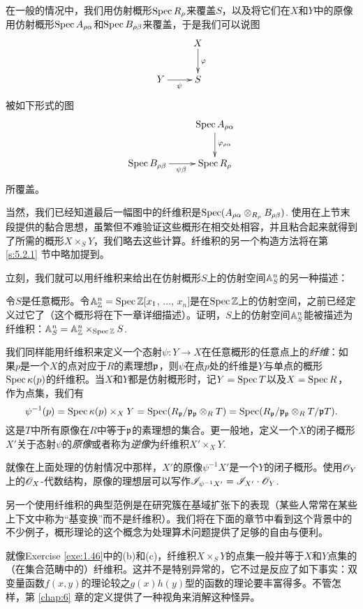 在一般的情况中，我们用仿射概形$\operatorname{Spec} R_\rho$来覆盖$S$，以及将它们在$X$和$Y$中的原像用仿射概形$\operatorname{Spec} A_{\rho\alpha}$和$\operatorname{Spec} B_{\rho\beta}$来覆盖，于是我们可以说图
\[
	\xymatrix{
	&X\ar[d]^\varphi\\
	Y\ar[r]_\psi &S
	}
\]
被如下形式的图
\[
	\xymatrix{
	&\spec A_{\rho\alpha}\ar[d]^{\varphi_{\rho\alpha}}\\
	\spec B_{\rho\beta}\ar[r]_{\psi\beta} &\spec R_{\rho}
	}
\]
所覆盖。

当然，我们已经知道最后一幅图中的纤维积是$\operatorname{Spec}(A_{\rho\alpha}\otimes_{R_\rho}B_{\rho\beta})$. 使用在上节末段提供的黏合思想，虽繁但不难验证这些概形在相交处相容，并且粘合起来就得到了所需的概形$X\times_S Y$，我们略去这些计算。纤维积的另一个构造方法将在第 \ref{s:5.2.1} 节中略加提到。

立刻，我们就可以用纤维积来给出在仿射概形$S$上的仿射空间$\mathbb{A}_S^n$的另一种描述：

\begin{exe}\label{exe:1.47}
令$S$是任意概形。令$\mathbb{A}_{\mathbb{Z}}^n=\operatorname{Spec} \mathbb{Z}[x_1$, $\dots$, $x_n]$是在$\operatorname{Spec} \mathbb{Z}$上的仿射空间，之前已经定义过它了（这个概形将在下一章详细描述）。证明，$S$上的仿射空间$\mathbb{A}_S^n$能被描述为纤维积：$\mathbb{A}_S^n=\mathbb{A}_{\mathbb{Z}}^n\times_{\operatorname{Spec} \mathbb{Z}} S$.
\end{exe}

我们同样能用纤维积来定义一个态射$\psi:Y\to X$在任意概形的任意点上的\textit{纤维}：如果$p$是一个$X$的点对应于$R$的素理想$\mathfrak{p}$，则$\psi$在点$p$处的纤维是$Y$与单点的概形$\operatorname{Spec} \kappa(p)$的纤维积。当$X$和$Y$都是仿射概形时，记$Y=\operatorname{Spec} T$以及$X=\operatorname{Spec} R$，作为点集，我们有
\[
	\psi^{-1}(p)=\operatorname{Spec} \kappa(p)\times_X Y=\operatorname{Spec} (R_{\mathfrak{p}} /\mathfrak{p}_{\mathfrak{p}} \otimes_R T)=\operatorname{Spec} (R_{\mathfrak{p}}/\mathfrak{p}_{\mathfrak{p}} \otimes_R T/\mathfrak{p} T).
\]
这是$T$中所有原像在$R$中等于$\mathfrak{p}$的素理想的集合。更一般地，定义一个$X$的闭子概形$X'$关于态射$\psi$的\textit{原像}或者称为\textit{逆像}为纤维积$X'\times_X Y$.

就像在上面处理的仿射情况中那样，$X'$的原像$\psi^{-1}X'$是一个$Y$的闭子概形。使用$\mathscr{O}_Y$上的$\mathscr{O}_X$-代数结构，原像的理想层可以写作$\mathscr{I}_{\psi^{-1} X'}=\mathscr{I}_{X'}\cdot \mathscr{O}_Y$.

另一个使用纤维积的典型范例是在研究簇在基域扩张下的表现（某些人常常在某些上下文中称为“基变换”而不是纤维积）。我们将在下面的章节中看到这个背景中的不少例子，概形理论的这个概念为处理算术问题提供了足够的自由与便利。

就像Exercise \ref{exe:1.46}中的(b)和(c)，纤维积$X\times_S Y$的点集一般并等于$X$和$Y$点集的（在集合范畴中的）纤维积。这并不是特别异常的，它不过是反应了如下事实：双变量函数$f(x,y)$的理论较之$g(x)h(y)$型的函数的理论要丰富得多。不管怎样，第 \ref{chap:6} 章的定义提供了一种视角来消解这种怪异。

